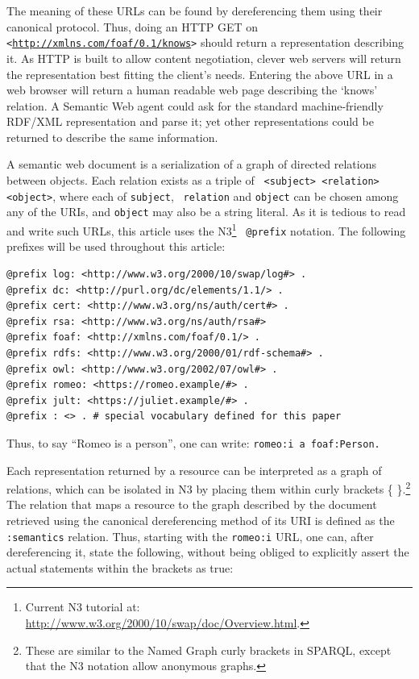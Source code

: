\documentclass{llncs}
\begin{document}
The meaning of these URLs can be found by dereferencing them using
their canonical protocol. Thus, doing an HTTP GET on {\tt
  <\url{http://xmlns.com/foaf/0.1/knows}>} should return a
representation describing it. As HTTP is built to allow content
negotiation, clever web servers will return the representation best
fitting the client's needs. Entering the above URL in a web browser
will return a human readable web page describing the `knows'
relation. A Semantic Web agent could ask for the standard
machine-friendly RDF/XML representation and parse it; yet other
representations could be returned to describe the same information.

A semantic web document is a serialization of a graph of directed
relations between objects. Each relation exists as a triple of {\tt
  <subject> <relation> <object>}, where each of {\tt subject}, {\tt
  relation} and {\tt object} can be chosen among any of the URIs, and
{\tt object} may also be a string literal. As it is tedious to read
and write such URLs, this article uses the N3\footnote{Current N3
  tutorial at:
  \url{http://www.w3.org/2000/10/swap/doc/Overview.html}.} {\tt
  @prefix} notation. The following prefixes will be used throughout
this article:

\begin{lstlisting}[basicstyle=\rm\scriptsize\ttfamily]
@prefix log: <http://www.w3.org/2000/10/swap/log#> .
@prefix dc: <http://purl.org/dc/elements/1.1/> .
@prefix cert: <http://www.w3.org/ns/auth/cert#> .
@prefix rsa: <http://www.w3.org/ns/auth/rsa#>
@prefix foaf: <http://xmlns.com/foaf/0.1/> .
@prefix rdfs: <http://www.w3.org/2000/01/rdf-schema#> .
@prefix owl: <http://www.w3.org/2002/07/owl#> .
@prefix romeo: <https://romeo.example/#> . 
@prefix jult: <https://juliet.example/#> . 
@prefix : <> . # special vocabulary defined for this paper 
\end{lstlisting}

Thus, to say ``Romeo is a person'', one can write: {\tt romeo:i a foaf:Person.}

Each representation returned by a resource can be interpreted as a
graph of relations, which can be isolated in N3 by placing them within
curly brackets \{ \}.\footnote{These are similar to the Named Graph curly
brackets in SPARQL, except that the N3 notation allow anonymous graphs.}  The
relation that maps a resource to the graph described by the document retrieved using the
canonical dereferencing method of its URI  is defined as the {\tt :semantics} relation. Thus,
starting with the {\tt romeo:i} URL, one can, after dereferencing it,
state the following, without being obliged to explicitly assert the
actual statements within the brackets as true:
\end{document}
